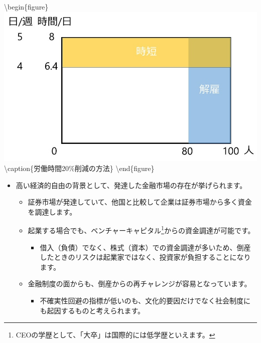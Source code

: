 \documentclass[
]{book}
\providecommand{\tightlist}{%
  \setlength{\itemsep}{0pt}\setlength{\parskip}{0pt}}
\begin{document}
\textbackslash begin\{figure\}
\includegraphics[width=960px]{layoff} \textbackslash caption\{労働時間20\%削減の方法\}\label{fig:layoff}
\textbackslash end\{figure\}

\begin{itemize}
\item
  高い経済的自由の背景として、発達した金融市場の存在が挙げられます。

  \begin{itemize}
  \item
    証券市場が発達していて、他国と比較して企業は証券市場から多く資金を調達します。
  \item
    起業する場合でも、ベンチャーキャピタル\footnote{CEOの学歴として、「大卒」は国際的には低学歴といえます。}からの資金調達が可能です。

    \begin{itemize}
    \tightlist
    \item
      借入（負債）でなく、株式（資本）での資金調達が多いため、倒産したときのリスクは起業家ではなく、投資家が負担することになります。
    \end{itemize}
  \item
    金融制度の面からも、倒産からの再チャレンジが容易となっています。

    \begin{itemize}
    \tightlist
    \item
      不確実性回避の指標が低いのも、文化的要因だけでなく社会制度にも起因するものと考えられます。
    \end{itemize}
  \end{itemize}
\end{itemize}
\end{document}
